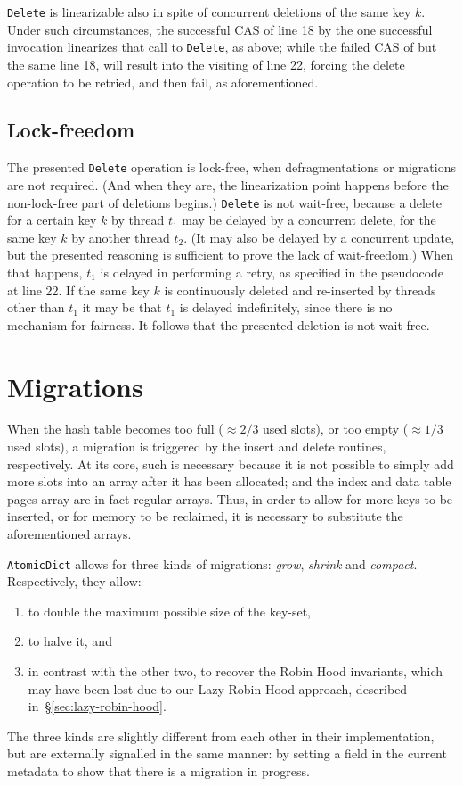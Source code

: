\texttt{Delete} is linearizable also in spite of concurrent deletions of the same key $k$.
Under such circumstances, the successful CAS of line 18 by the one successful invocation linearizes that call to \texttt{Delete}, as above; while the failed CAS of but the same line 18, will result into the visiting of line 22, forcing the delete operation to be retried, and then fail, as aforementioned.

\subsection{Lock-freedom}\label{subsec:delete-lock-freedom}

The presented \texttt{Delete} operation is lock-free, when defragmentations or migrations are not required.
(And when they are, the linearization point happens before the non-lock-free part of deletions begins.)
\texttt{Delete} is not wait-free, because a delete for a certain key $k$ by thread $t_1$ may be delayed by a concurrent delete, for the same key $k$ by another thread $t_2$.
(It may also be delayed by a concurrent update, but the presented reasoning is sufficient to prove the lack of wait-freedom.)
When that happens, $t_1$ is delayed in performing a retry, as specified in the pseudocode at line 22.
If the same key $k$ is continuously deleted and re-inserted by threads other than $t_1$ it may be that $t_1$ is delayed indefinitely, since there is no mechanism for fairness.
It follows that the presented deletion is not wait-free.


\section{Migrations}\label{sec:migrations}

When the hash table becomes too full ($\approx 2/3$ used slots), or too empty ($\approx 1/3$ used slots), a migration is triggered by the insert and delete routines, respectively.
At its core, such is necessary because it is not possible to simply add more slots into an array after it has been allocated; and the index and data table pages array are in fact regular arrays.
Thus, in order to allow for more keys to be inserted, or for memory to be reclaimed, it is necessary to substitute the aforementioned arrays.

\texttt{AtomicDict} allows for three kinds of migrations: \emph{grow}, \emph{shrink} and \emph{compact}.
Respectively, they allow:
\begin{enumerate}
    \item to double the maximum possible size of the key-set,
    \item to halve it, and
    \item in contrast with the other two, to recover the Robin Hood invariants, which may have been lost due to our Lazy Robin Hood approach, described in~\S\ref{sec:lazy-robin-hood}.
\end{enumerate}
The three kinds are slightly different from each other in their implementation, but are externally signalled in the same manner: by setting a field in the current metadata to show that there is a migration in progress.

